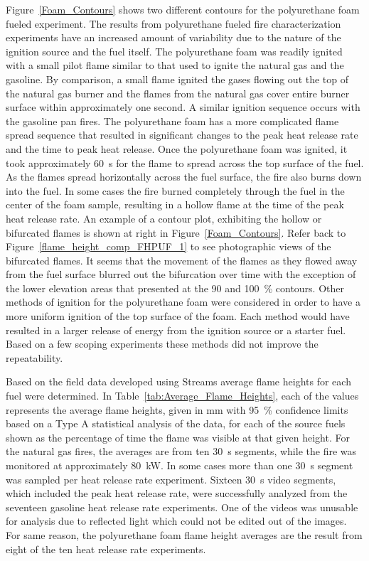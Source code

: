 \documentclass[twoside]{uocthesis}
\begin{document}
{Figure~\ref{Foam_Contours} shows two different contours for the polyurethane foam fueled experiment.  The results from polyurethane fueled fire characterization experiments have an increased amount of variability due to the nature of the ignition source and the fuel itself.  The polyurethane foam was readily ignited with a small pilot flame similar to that used to ignite the natural gas and the gasoline.  By comparison, a small flame ignited the gases flowing out the top of the natural gas burner and the flames from the natural gas cover entire burner surface within approximately one second.  A similar ignition sequence occurs with the gasoline pan fires. The polyurethane foam has a more complicated flame spread sequence that resulted in significant changes to the peak heat release rate and the time to peak heat release.  Once the polyurethane foam was ignited, it took approximately 60~s for the flame to spread across the top surface of the fuel.  As the flames spread horizontally across the fuel surface, the fire also burns down into the fuel.  In some cases the fire burned completely through the fuel in the center of the foam sample, resulting in a hollow flame at the time of the peak heat release rate.  An example of a contour plot, exhibiting the hollow or bifurcated flames is shown at right in Figure~\ref{Foam_Contours}. Refer back to Figure~\ref{flame_height_comp_FHPUF_1} to see photographic views of the bifurcated flames.  It seems that the movement of the flames as they flowed away from the fuel surface blurred out the bifurcation over time with the exception of the lower elevation areas that presented at the 90 and 100~\% contours.  Other methods of ignition for the polyurethane foam were considered in order to have a more uniform ignition of the top surface of the foam.  Each method would have resulted in a larger release of energy from the ignition source or a starter fuel.   Based on a few scoping experiments these methods did not improve the repeatability.

Based on the field data developed using Streams average flame heights for each fuel were determined.  In Table~\ref{tab:Average_Flame_Heights}, each of the values represents the average flame heights, given in mm with 95~\% confidence limits based on a Type A statistical analysis of the data, for each of the source fuels shown as the percentage of time the flame was visible at that given height.  For the natural gas fires, the averages are from ten 30~s segments, while the fire was monitored at approximately 80~kW.  In some cases more than one 30~s segment was sampled per heat release rate experiment.  Sixteen 30~s video segments, which included the peak heat release rate, were successfully analyzed from the seventeen gasoline heat release rate experiments.  One of the videos was unusable for analysis due to reflected light which could not be edited out of the images.  For same reason, the polyurethane foam flame height averages are the result from eight of the ten heat release rate experiments.

}
\end{document}
